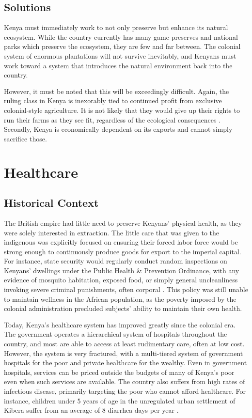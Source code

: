 \documentclass[american]{../../../coursework}
\begin{document}
\subsection{Solutions}

Kenya must immediately work to not only preserve but enhance its natural
ecosystem. While the country currently has many game preserves and national
parks which preserve the ecosystem, they are few and far between. The colonial
system of enormous plantations will not survive inevitably, and Kenyans must
work toward a system that introduces the natural environment back into the
country.

However, it must be noted that this will be exceedingly difficult. Again, the
ruling class in Kenya is inexorably tied to continued profit from exclusive
colonial-style agriculture. It is not likely that they would give up their
rights to run their farms as they see fit, regardless of the ecological
consequences \parencite{Berg-Schlosser1982}. Secondly, Kenya is economically
dependent on its exports and cannot simply sacrifice those.

\section{Healthcare}
\subsection{Historical Context}

The British empire had little need to preserve Kenyans' physical health, as
they were solely interested in extraction. The little care that was given to
the indigenous was explicitly focused on ensuring their forced labor force
would be strong enough to continuously produce goods for export to the
imperial capital. For instance, state security would regularly conduct random
inspections on Kenyans' dwellings under the Public Health \& Prevention
Ordinance, with any evidence of mosquito habitation, exposed food, or simply
general uncleanliness invoking severe criminal punishments, often corporal
\parencite{Achola2010}. This policy was still unable to maintain wellness in
the African population, as the poverty imposed by the colonial administration
precluded subjects' ability to maintain their own health.

Today, Kenya's healthcare system has improved greatly since the colonial era.
The government operates a hierarchical system of hospitals throughout the
country, and most are able to access at least rudimentary care, often at low
cost. However, the system is very fractured, with a multi-tiered system of
government hospitals for the poor and private healthcare for the wealthy. Even
in government hospitals, services can be priced outside the budgets of many of
Kenya's poor even when such services are available. The country also suffers
from high rates of infectious disease, primarily targeting the poor who cannot
afford healthcare. For instance, children under 5 years of age in the
unregulated urban settlement of Kibera suffer from an average of 8 diarrhea
days per year \parencite{Feikin2011}.
\end{document}
